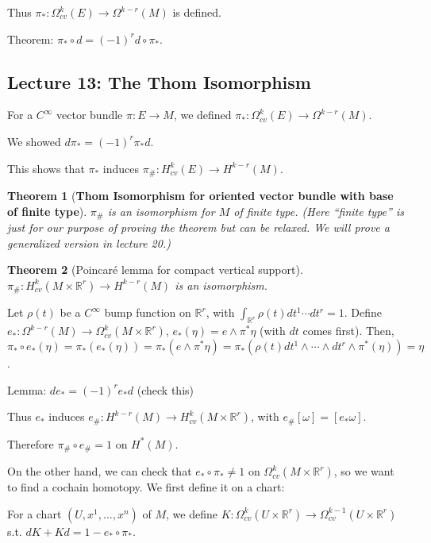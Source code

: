 \documentclass{article}
\theoremstyle{mystyle}
\newtheorem*{theorem*}{Theorem}
\theoremstyle{remark}
\numberwithin{equation}{section}
\begin{document}
Thus $\pi_*\colon \Omega^k_{cv}(E)\rightarrow \Omega^{k-r}(M)$ is defined.

Theorem: $\pi_*\circ d = (-1)^r d\circ \pi_*$. 


\subsection{Lecture 13: The Thom Isomorphism}


For a $C^\infty$ vector bundle $\pi\colon E\rightarrow M$, we defined $\pi_*\colon \Omega^k_{cv}(E)\rightarrow \Omega^{k-r}(M)$.

We showed $d\pi_* = (-1)^r \pi_*d$.

This shows that $\pi_*$ induces $\pi_\#\colon H^k_{cv}(E)\rightarrow H^{k-r}(M)$.

\begin{theorem*}[\textbf{Thom Isomorphism for oriented vector bundle with base of finite type}] $\pi_\#$ is an isomorphism for $M$ of finite type. (Here ``finite type'' is just for our purpose of proving the theorem but can be relaxed. We will prove a generalized version in lecture 20.)
\end{theorem*}


\begin{theorem*}[Poincar\'e lemma for compact vertical support]
$\pi_\#\colon H^k_{cv}(M\times \mathbb{R}^r)
\rightarrow H^{k-r}(M)$ is an isomorphism.
\end{theorem*}

Let $\rho(t)$ be a $C^\infty$ bump function on $\mathbb{R}^r$, with $\int_{\mathbb{R}^r}\rho(t) dt^1\cdots dt^r=1$. Define $e_*\colon \Omega^{k-r}(M)\rightarrow \Omega^k_{cv}(M\times \mathbb{R}^r)$, $e_*(\eta) =e\wedge \pi^*\eta$ (with $dt$ comes first). Then, $\pi_*\circ e_*(\eta)
= \pi_*(e_*(\eta)) = \pi_*(e\wedge \pi^*\eta) = \pi_*(\rho(t)dt^1\wedge \cdots \wedge dt^r\wedge \pi^*(\eta)) = \eta$.

Lemma: $de_* = (-1)^r e_*d$ (check this)

Thus $e_*$ induces $e_\#\colon H^{k-r}(M)\rightarrow H_{cv}^k(M\times \mathbb{R}^r)$, with $e_\#[\omega] = [e_*\omega]$.

Therefore $\pi_\#\circ e_\# = 1$ on $H^*(M)$.

On the other hand, we can check that $e_*\circ \pi_*\neq 1$ on $\Omega_{cv}^k(M\times \mathbb{R}^r)$, so we want to find a cochain homotopy. We first define it on a chart:

For a chart $(U,x^1,...,x^n)$ of $M$, we define $K\colon \Omega^k_{cv}(U\times \mathbb{R}^r)\rightarrow \Omega^{k-1}_{cv}(U\times \mathbb{R}^r)$ s.t. $dK+Kd = 1-e_*\circ \pi_*$.
\end{document}
